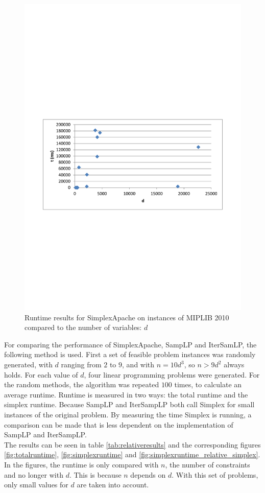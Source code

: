 \documentclass[nocopyrightspace]{acm_proc_article-sp}
\begin{document}
\begin{figure}[h!]
\includegraphics[width=\columnwidth]{../Results/miplib_apache_d.pdf}
\caption{Runtime results for SimplexApache on instances of MIPLIB 2010 \cite{KochEtAl2011} compared to the number of variables: $d$}
\label{fig:miplibresults_d}
\end{figure}

For comparing the performance of SimplexApache, SampLP and IterSamLP, the following method is used. First a set of feasible problem instances was randomly generated, with $d$ ranging from $2$ to $9$, and with $n = 10d^3$, so $n > 9d^2$ always holds. For each value of $d$, four linear programming problems were generated. For the random methods, the algorithm was repeated $100$ times, to calculate an average runtime. Runtime is measured in two ways: the total runtime and the simplex runtime. Because SampLP and IterSampLP both call Simplex for small instances of the original problem. By measuring the time Simplex is running, a comparison can be made that is less dependent on the implementation of SampLP and IterSampLP. \\
The results can be seen in table \ref{tab:relativeresults} and the corresponding figures \ref{fig:totalruntime}, \ref{fig:simplexruntime} and \ref{fig:simplexruntime_relative_simplex}. In the figures, the runtime is only compared with $n$, the number of constraints and no longer with $d$. This is because $n$ depends on $d$. With this set of problems, only small values for $d$ are taken into account.
\end{document}
